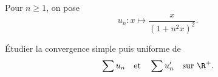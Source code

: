 \begin{enonce}
\begin{exercise}[ID={RMS135 E1460},subtitle={Navale MP 2024},tags={},difficulty={}]

Pour $n \geq 1$, on pose
\begin{equation*}
u_n : x \mapsto \frac{x}{(1 + n^2 x)^2}.
\end{equation*}

Étudier la convergence simple puis uniforme de
\begin{equation*}
\sum u_n \quad \text{et} \quad \sum u_n'
\quad \text{sur } \R^+.
\end{equation*}

\end{exercise}
\begin{solution}
\end{solution}
\end{enonce}
